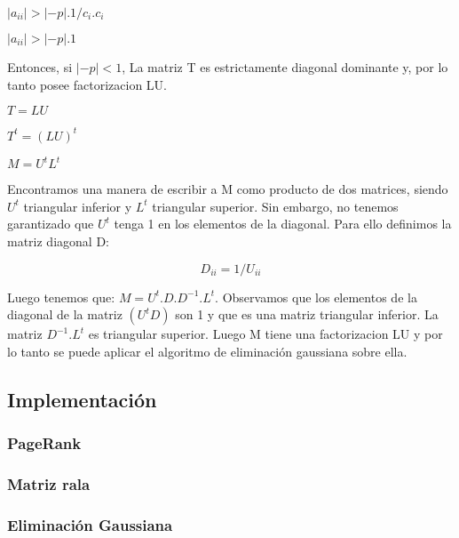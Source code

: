 $   |a_{ii}| > |-p|.1/c_i.c_i$

$   |a_{ii}| > |-p|.1 $

Entonces, si $|-p| < 1$, La matriz T es estrictamente diagonal dominante y, por lo tanto posee factorizacion LU. %


$T = LU$ 

$T^t = (LU)^t$ 

$M = U^tL^t$ 

Encontramos una manera de escribir a M como producto de dos matrices, siendo $U^t$ triangular inferior y $L^t$ triangular superior. Sin embargo, no tenemos garantizado que $U^t$ tenga 1 en los elementos de la diagonal. Para ello definimos la matriz diagonal D:

\begin{equation}
    \label{defD}
    D_{ii} = 1/U_{ii} %
\end{equation}

Luego tenemos que:
$M = U^t.D.D^{-1}.L^t$. Observamos que los elementos de la diagonal de la matriz $(U^tD)$ son 1 y que es una matriz triangular inferior. La matriz $D^{-1}.L^t$ es triangular superior. Luego M tiene una factorizacion LU y por lo tanto se puede aplicar el algoritmo de eliminación gaussiana sobre ella. 


\subsection{Implementación}
\subsubsection{PageRank}

\subsubsection{Matriz rala}

\subsubsection{Eliminación Gaussiana}


